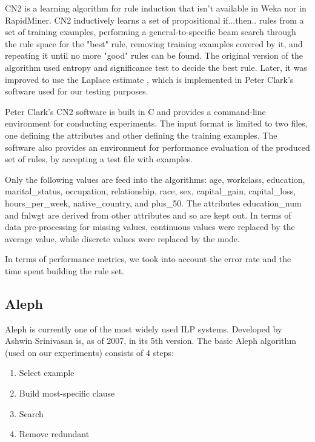 \documentclass[a4paper]{llncs}
\begin{document}
CN2 \cite{cn2} is a learning algorithm for rule induction \cite{rule_induction}
that isn't available in Weka nor in RapidMiner. CN2 inductively learns a set of
propositional if...then.. rules from a set of training examples, performing a
general-to-specific beam search through the rule space for the "best" rule, 
removing training examples covered by it, and repeating it until no more "good"
rules can be found. The original version of the algorithm used entropy and
significance test to decide the best rule. Later, it was improved to use the
Laplace estimate \cite{cn2_laplace}, which is implemented in Peter Clark's 
software used for our testing purposes.

Peter Clark's CN2 software is built in C and provides a command-line environment
for conducting experiments. The input format is limited to two files, one
defining the attributes and other defining the training examples. The software 
also provides an environment for performance evaluation of the produced set of 
rules, by accepting a test file with examples.

Only the following values are feed into the algorithms: age, workclass, 
education, marital\_status, occupation, relationship, race, sex, capital\_gain,
capital\_loss, hours\_per\_week, native\_country, and plus\_50. The attributes
education\_num and fnlwgt are derived from other attributes and so are kept out.
In terms of data pre-processing for missing values, continuous values were 
replaced by the average value, while discrete values were replaced by the mode.

In terms of performance metrics, we took into account the error rate and the 
time spent building the rule set. 

\subsection{Aleph}

Aleph \cite{aleph} is currently one of the most widely used ILP \cite{ilp} 
systems. Developed by Ashwin Srinivasan is, as of 2007, in its 5th version. The
basic Aleph algorithm (used on our experiments) consists of 4 steps:

\begin{enumerate}
    \item{Select example}
    \item{Build most-specific clause}
    \item{Search}
    \item{Remove redundant}
\end{enumerate}
\end{document}
